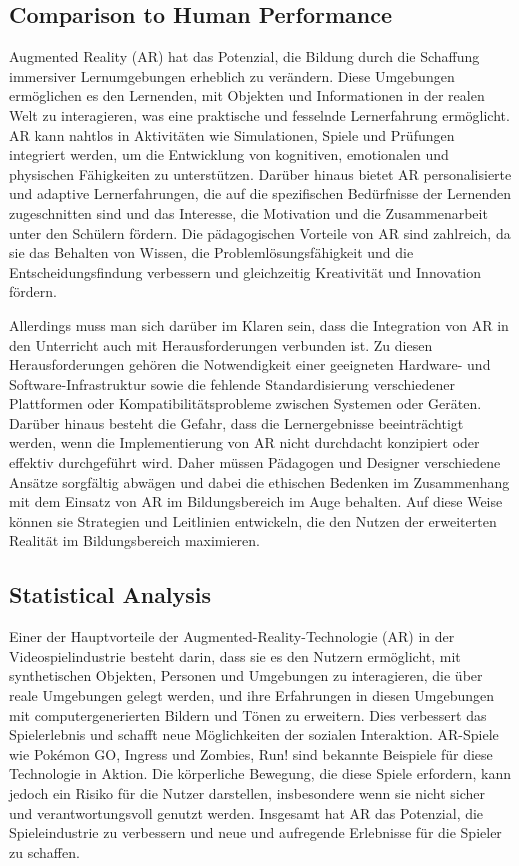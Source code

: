 \subsection{Comparison to Human Performance}

Augmented Reality (AR) hat das Potenzial, die Bildung durch die Schaffung immersiver Lernumgebungen erheblich zu verändern. Diese Umgebungen ermöglichen es den Lernenden, mit Objekten und Informationen in der realen Welt zu interagieren, was eine praktische und fesselnde Lernerfahrung ermöglicht. AR kann nahtlos in Aktivitäten wie Simulationen, Spiele und Prüfungen integriert werden, um die Entwicklung von kognitiven, emotionalen und physischen Fähigkeiten zu unterstützen. Darüber hinaus bietet AR personalisierte und adaptive Lernerfahrungen, die auf die spezifischen Bedürfnisse der Lernenden zugeschnitten sind und das Interesse, die Motivation und die Zusammenarbeit unter den Schülern fördern. Die pädagogischen Vorteile von AR sind zahlreich, da sie das Behalten von Wissen, die Problemlösungsfähigkeit und die Entscheidungsfindung verbessern und gleichzeitig Kreativität und Innovation fördern. \cite{Wu2013CurrentSO}

Allerdings muss man sich darüber im Klaren sein, dass die Integration von AR in den Unterricht auch mit Herausforderungen verbunden ist. Zu diesen Herausforderungen gehören die Notwendigkeit einer geeigneten Hardware- und Software-Infrastruktur sowie die fehlende Standardisierung verschiedener Plattformen oder Kompatibilitätsprobleme zwischen Systemen oder Geräten. Darüber hinaus besteht die Gefahr, dass die Lernergebnisse beeinträchtigt werden, wenn die Implementierung von AR nicht durchdacht konzipiert oder effektiv durchgeführt wird. Daher müssen Pädagogen und Designer verschiedene Ansätze sorgfältig abwägen und dabei die ethischen Bedenken im Zusammenhang mit dem Einsatz von AR im Bildungsbereich im Auge behalten. Auf diese Weise können sie Strategien und Leitlinien entwickeln, die den Nutzen der erweiterten Realität im Bildungsbereich maximieren.\cite{Wu2013CurrentSO}


\subsection{Statistical Analysis}

Einer der Hauptvorteile der Augmented-Reality-Technologie (AR) in der Videospielindustrie besteht darin, dass sie es den Nutzern ermöglicht, mit synthetischen Objekten, Personen und Umgebungen zu interagieren, die über reale Umgebungen gelegt werden, und ihre Erfahrungen in diesen Umgebungen mit computergenerierten Bildern und Tönen zu erweitern. Dies verbessert das Spielerlebnis und schafft neue Möglichkeiten der sozialen Interaktion. AR-Spiele wie Pokémon GO, Ingress und Zombies, Run! sind bekannte Beispiele für diese Technologie in Aktion. Die körperliche Bewegung, die diese Spiele erfordern, kann jedoch ein Risiko für die Nutzer darstellen, insbesondere wenn sie nicht sicher und verantwortungsvoll genutzt werden. Insgesamt hat AR das Potenzial, die Spieleindustrie zu verbessern und neue und aufregende Erlebnisse für die Spieler zu schaffen. \cite{Das2017AugmentedRV}



